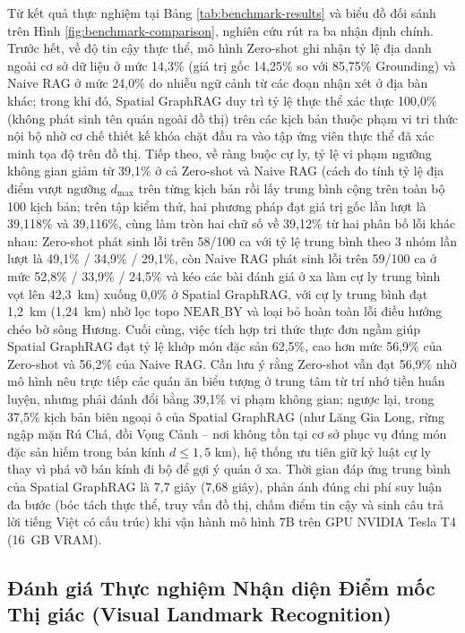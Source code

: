 Từ kết quả thực nghiệm tại Bảng \ref{tab:benchmark-results} và biểu đồ đối sánh trên Hình \ref{fig:benchmark-comparison}, nghiên cứu rút ra ba nhận định chính. Trước hết, về độ tin cậy thực thể, mô hình Zero-shot ghi nhận tỷ lệ địa danh ngoài cơ sở dữ liệu ở mức 14,3\% (giá trị gốc 14,25\% so với 85,75\% Grounding) và Naive RAG ở mức 24,0\% do nhiễu ngữ cảnh từ các đoạn nhận xét ở địa bàn khác; trong khi đó, Spatial GraphRAG duy trì tỷ lệ thực thể xác thực 100,0\% (không phát sinh tên quán ngoài đồ thị) trên các kịch bản thuộc phạm vi tri thức nội bộ nhờ cơ chế thiết kế khóa chặt đầu ra vào tập ứng viên thực thể đã xác minh tọa độ trên đồ thị. Tiếp theo, về ràng buộc cự ly, tỷ lệ vi phạm ngưỡng không gian giảm từ 39,1\% ở cả Zero-shot và Naive RAG (cách đo tính tỷ lệ địa điểm vượt ngưỡng $d_{\max}$ trên từng kịch bản rồi lấy trung bình cộng trên toàn bộ 100 kịch bản; trên tập kiểm thử, hai phương pháp đạt giá trị gốc lần lượt là 39,118\% và 39,116\%, cùng làm tròn hai chữ số về 39,12\% từ hai phân bố lỗi khác nhau: Zero-shot phát sinh lỗi trên 58/100 ca với tỷ lệ trung bình theo 3 nhóm lần lượt là 49,1\% / 34,9\% / 29,1\%, còn Naive RAG phát sinh lỗi trên 59/100 ca ở mức 52,8\% / 33,9\% / 24,5\% và kéo các bài đánh giá ở xa làm cự ly trung bình vọt lên 42,3~km) xuống 0,0\% ở Spatial GraphRAG, với cự ly trung bình đạt 1,2~km (1,24~km) nhờ lọc topo $\text{NEAR\_BY}$ và loại bỏ hoàn toàn lỗi điều hướng chéo bờ sông Hương. Cuối cùng, việc tích hợp tri thức thực đơn ngầm giúp Spatial GraphRAG đạt tỷ lệ khớp món đặc sản 62,5\%, cao hơn mức 56,9\% của Zero-shot và 56,2\% của Naive RAG. Cần lưu ý rằng Zero-shot vẫn đạt 56,9\% nhờ mô hình nêu trực tiếp các quán ăn biểu tượng ở trung tâm từ trí nhớ tiền huấn luyện, nhưng phải đánh đổi bằng 39,1\% vi phạm không gian; ngược lại, trong 37,5\% kịch bản biên ngoại ô của Spatial GraphRAG (như Lăng Gia Long, rừng ngập mặn Rú Chá, đồi Vọng Cảnh -- nơi không tồn tại cơ sở phục vụ đúng món đặc sản hiếm trong bán kính $d \le 1{,}5\text{ km}$), hệ thống ưu tiên giữ kỷ luật cự ly thay vì phá vỡ bán kính đi bộ để gợi ý quán ở xa. Thời gian đáp ứng trung bình của Spatial GraphRAG là 7,7 giây (7,68 giây), phản ánh đúng chi phí suy luận đa bước (bóc tách thực thể, truy vấn đồ thị, chấm điểm tin cậy và sinh câu trả lời tiếng Việt có cấu trúc) khi vận hành mô hình 7B trên GPU NVIDIA Tesla T4 (16~GB VRAM).

\subsection{Đánh giá Thực nghiệm Nhận diện Điểm mốc Thị giác (Visual Landmark Recognition)}
\label{subsec:ch2-visual-evaluation}

